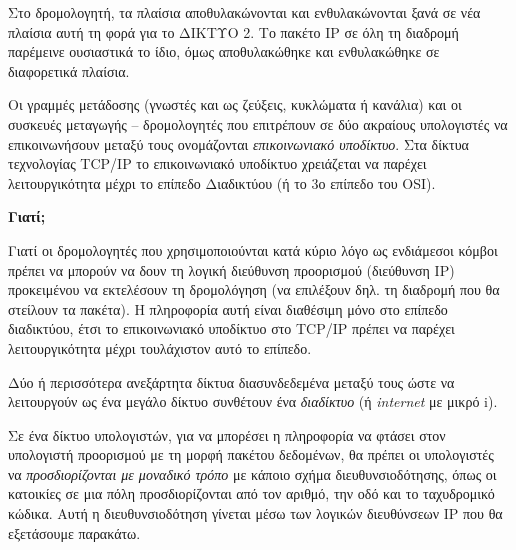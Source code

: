 Στο δρομολογητή, τα πλαίσια αποθυλακώνονται και ενθυλακώνονται ξανά σε νέα πλαίσια αυτή τη φορά για το ΔΙΚΤΥΟ 2.  Το πακέτο IP σε όλη τη διαδρομή παρέμεινε ουσιαστικά το ίδιο, όμως αποθυλακώθηκε και ενθυλακώθηκε σε διαφορετικά πλαίσια.

Οι γραμμές μετάδοσης (γνωστές και ως ζεύξεις, κυκλώματα ή κανάλια) και οι συσκευές μεταγωγής -- δρομολογητές που επιτρέπουν σε δύο ακραίους υπολογιστές να επικοινωνήσουν μεταξύ τους ονομάζονται \emph{επικοινωνιακό υποδίκτυο}. Στα δίκτυα τεχνολογίας TCP/IP το επικοινωνιακό υποδίκτυο χρειάζεται να παρέχει λειτουργικότητα μέχρι το επίπεδο Διαδικτύου (ή το 3ο επίπεδο του OSI).

\begin{inthebox}
\textbf{Γιατί;}

Γιατί οι δρομολογητές που χρησιμοποιούνται κατά κύριο λόγο ως ενδιάμεσοι κόμβοι πρέπει να μπορούν να δουν τη λογική διεύθυνση προορισμού (διεύθυνση IP) προκειμένου να εκτελέσουν τη δρομολόγηση (να επιλέξουν δηλ. τη διαδρομή που θα στείλουν τα πακέτα). Η πληροφορία αυτή είναι διαθέσιμη μόνο στο επίπεδο διαδικτύου, έτσι το επικοινωνιακό υποδίκτυο στο TCP/IP πρέπει να παρέχει λειτουργικότητα μέχρι τουλάχιστον αυτό το επίπεδο.\\
\end{inthebox}

Δύο ή περισσότερα ανεξάρτητα δίκτυα διασυνδεδεμένα μεταξύ τους ώστε να λειτουργούν ως ένα μεγάλο δίκτυο συνθέτουν ένα \emph{διαδίκτυο} (ή \emph{internet} με μικρό i).

Σε ένα δίκτυο υπολογιστών, για να μπορέσει η πληροφορία να φτάσει στον υπολογιστή προορισμού με τη μορφή πακέτου δεδομένων, θα πρέπει οι υπολογιστές να  \emph{προσδιορίζονται με μοναδικό τρόπο} με κάποιο σχήμα διευθυνσιοδότησης, όπως οι κατοικίες σε μια πόλη προσδιορίζονται από τον αριθμό, την οδό και το ταχυδρομικό κώδικα. Αυτή η διευθυνσιοδότηση γίνεται μέσω των λογικών διευθύνσεων IP που θα εξετάσουμε παρακάτω.